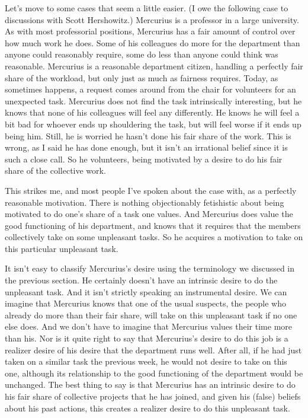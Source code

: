 \documentclass[
  10pt,
  letterpaper,
  twoside]{scrbook}
\begin{document}
Let's move to some cases that seem a little easier. (I owe the following
case to discussions with Scott Hershowitz.) {Mercurius} is a professor
in a large university. As with most professorial positions, {Mercurius}
has a fair amount of control over how much work he does. Some of his
colleagues do more for the department than anyone could reasonably
require, some do less than anyone could think was reasonable.
{Mercurius} is a reasonable department citizen, handling a perfectly
fair share of the workload, but only just as much as fairness requires.
Today, as sometimes happens, a request comes around from the chair for
volunteers for an unexpected task. {Mercurius} does not find the task
intrinsically interesting, but he knows that none of his colleagues will
feel any differently. He knows he will feel a bit bad for whoever ends
up shouldering the task, but will feel worse if it ends up being him.
Still, he is worried he hasn't done his fair share of the work. This is
wrong, as I said he has done enough, but it isn't an irrational belief
since it is such a close call. So he volunteers, being motivated by a
desire to do his fair share of the collective work.

This strikes me, and most people I've spoken about the case with, as a
perfectly reasonable motivation. There is nothing objectionably
fetishistic about being motivated to do one's share of a task one
values. And {Mercurius} does value the good functioning of his
department, and knows that it requires that the members collectively
take on some unpleasant tasks. So he acquires a motivation to take on
this particular unpleasant task.

It isn't easy to classify {Mercurius}'s desire using the terminology we
discussed in the previous section. He certainly doesn't have an
intrinsic desire to do the unpleasant task. And it isn't strictly
speaking an instrumental desire. We can imagine that {Mercurius} knows
that one of the usual suspects, the people who already do more than
their fair share, will take on this unpleasant task if no one else does.
And we don't have to imagine that {Mercurius} values their time more
than his. Nor is it quite right to say that {Mercurius}'s desire to do
this job is a realizer desire of his desire that the department runs
well. After all, if he had just taken on a similar task the previous
week, he would not desire to take on this one, although its relationship
to the good functioning of the department would be unchanged. The best
thing to say is that {Mercurius} has an intrinsic desire to do his fair
share of collective projects that he has joined, and given his (false)
beliefs about his past actions, this creates a realizer desire to do
this unpleasant task.
\end{document}
